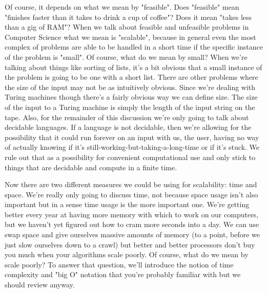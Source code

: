 \documentclass[11pt]{article}
\begin{document}
Of course, it depends on what we mean by "feasible". Does "feasible" mean "finishes faster than it takes to drink a cup of coffee"? Does it mean "takes less than a gig of RAM"? When we talk about feasible and unfeasible problems in Computer Science what we mean is "scalable", because in general even the most complex of problems are able to be handled in a short time if the specific instance of the problem is "small". Of course, what do we mean by small? When we're talking about things like sorting of lists, it's a bit obvious that a small instance of the problem is going to be one with a short list. There are other problems where the size of the input may not be as intuitively obvious. Since we're dealing with Turing machines though there's a fairly obvious way we can define size. The size of the input to a Turing machine is simply the length of the input string on the tape. Also, for the remainder of this discussion we're only going to talk about decidable languages. If a language is not decidable, then we're allowing for the possibility that it could run forever on an input with us, the user, having no way of actually knowing if it's still-working-but-taking-a-long-time or if it's stuck. We rule out that as a possibility for convenient computational use and only stick to things that are decidable and compute in a finite time.

Now there are two different measures we could be using for scalability: time and space. We're really only going to discuss time, not because space usage isn't also important but in a sense time usage is the more important one. We're getting better every year at having more memory with which to work on our computers, but we haven't yet figured out how to cram more seconds into a day. We can use swap space and give ourselves massive amounts of memory (to a point, before we just slow ourselves down to a crawl) but better and better processors don't buy you much when your algorithms scale poorly. Of course, what do we mean by scale poorly? To answer that question, we'll introduce the notion of time complexity and "big O" notation that you're probably familiar with but we should review anyway.
\end{document}
